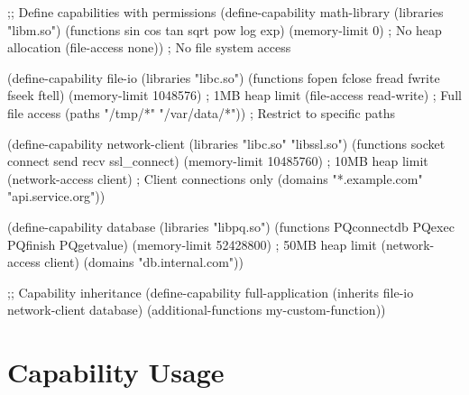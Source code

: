 \begin{example}
\begin{lambdustcode}
;; Define capabilities with permissions
(define-capability math-library
  (libraries "libm.so")
  (functions sin cos tan sqrt pow log exp)
  (memory-limit 0)      ; No heap allocation
  (file-access none))   ; No file system access

(define-capability file-io  
  (libraries "libc.so")
  (functions fopen fclose fread fwrite fseek ftell)
  (memory-limit 1048576)    ; 1MB heap limit
  (file-access read-write)  ; Full file access
  (paths "/tmp/*" "/var/data/*"))  ; Restrict to specific paths

(define-capability network-client
  (libraries "libc.so" "libssl.so")
  (functions socket connect send recv ssl_connect)
  (memory-limit 10485760)   ; 10MB heap limit
  (network-access client)   ; Client connections only
  (domains "*.example.com" "api.service.org"))

(define-capability database
  (libraries "libpq.so")
  (functions PQconnectdb PQexec PQfinish PQgetvalue)
  (memory-limit 52428800)   ; 50MB heap limit
  (network-access client)
  (domains "db.internal.com"))

;; Capability inheritance
(define-capability full-application
  (inherits file-io network-client database)
  (additional-functions my-custom-function))
\end{lambdustcode}
\end{example}

\section{Capability Usage}
\label{sec:capability-usage}


